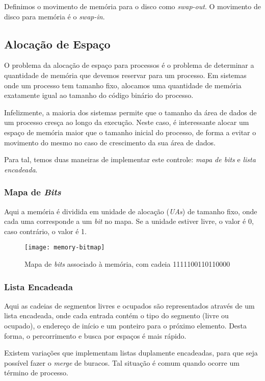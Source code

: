 Definimos o movimento de memória para o disco como \textit{swap-out}. O movimento de disco para memória é o \textit{swap-in}.



\subsection{Alocação de Espaço}
O problema da alocação de espaço para processos é o problema de determinar a quantidade de memória que devemos reservar para um processo. Em sistemas onde um processo tem tamanho fixo, alocamos uma quantidade de memória exatamente igual ao tamanho do código binário do processo.

Infelizmente, a maioria dos sistemas permite que o tamanho da área de dados de um processo cresça ao longo da execução. Neste caso, é interessante alocar um espaço de memória maior que o tamanho inicial do processo, de forma a evitar o movimento do mesmo no caso de crescimento da sua área de dados.

Para tal, temos duas maneiras de implementar este controle: \textit{mapa de bits} e \textit{lista encadeada}.


\subsubsection{Mapa de \textit{Bits}}
Aqui a memória é dividida em unidade de alocação (\textit{UAs}) de tamanho fixo, onde cada uma corresponde a um \textit{bit} no mapa. Se a unidade estiver livre, o valor é 0, caso contrário, o valor é 1.

\begin{figure}[h]
  \centering
  \texttt{[image: memory-bitmap]}
  \caption{Mapa de \textit{bits} associado à memória, com cadeia 1111100110110000}
  \label{fig:memory-bitmap}
\end{figure}


\subsubsection{Lista Encadeada}
Aqui as cadeias de segmentos livres e ocupados são representados através de um lista encadeada, onde cada entrada contém o tipo do segmento (livre ou ocupado), o endereço de início e um ponteiro para o próximo elemento. Desta forma, o percorrimento e busca por espaços é mais rápido.

Existem variações que implementam listas duplamente encadeadas, para que seja possível fazer o \textit{merge} de buracos. Tal situação é comum quando ocorre um término de processo.

